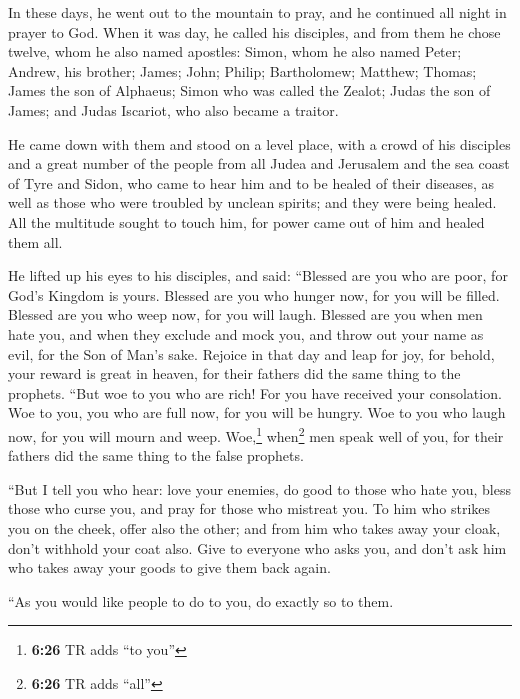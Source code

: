  In these days, he went out to the mountain to pray, and
he continued all night in prayer to God.  When it was
day, he called his disciples, and from them he chose twelve, whom he
also named apostles:  Simon, whom he also named Peter;
Andrew, his brother; James; John; Philip; Bartholomew; 
Matthew; Thomas; James the son of Alphaeus; Simon who was called the
Zealot;  Judas the son of James; and Judas Iscariot, who
also became a traitor.

 He came down with them and stood on a level place, with
a crowd of his disciples and a great number of the people from all Judea
and Jerusalem and the sea coast of Tyre and Sidon, who came to hear him
and to be healed of their diseases,  as well as those who
were troubled by unclean spirits; and they were being healed.
 All the multitude sought to touch him, for power came
out of him and healed them all.

 He lifted up his eyes to his disciples, and said:
``Blessed are you who are poor, for God's Kingdom is yours.
 Blessed are you who hunger now, for you will be filled.
Blessed are you who weep now, for you will laugh. 
Blessed are you when men hate you, and when they exclude and mock you,
and throw out your name as evil, for the Son of Man's sake.
 Rejoice in that day and leap for joy, for behold, your
reward is great in heaven, for their fathers did the same thing to the
prophets.  ``But woe to you who are rich! For you have
received your consolation.  Woe to you, you who are full
now, for you will be hungry. Woe to you who laugh now, for you will
mourn and weep.  Woe,\footnote{\textbf{6:26} TR adds ``to
  you''} when\footnote{\textbf{6:26} TR adds ``all''} men speak well of
you, for their fathers did the same thing to the false prophets.

 ``But I tell you who hear: love your enemies, do good to
those who hate you,  bless those who curse you, and pray
for those who mistreat you.  To him who strikes you on
the cheek, offer also the other; and from him who takes away your cloak,
don't withhold your coat also.  Give to everyone who asks
you, and don't ask him who takes away your goods to give them back
again.

 ``As you would like people to do to you, do exactly so
to them.

